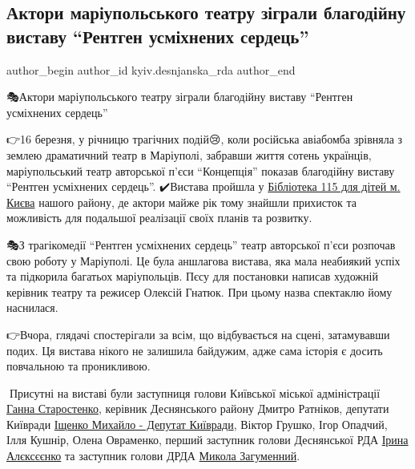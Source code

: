  
 
 
 
 

\subsection{Актори маріупольського театру зіграли благодійну виставу \enquote{Рентген усміхнених сердець}}
\label{sec:17_03_2023.fb.kyiv.desnjanska_rda.1.mariupol_teatr_rentgen_serdec}

\ifcmt
 author_begin
   author_id kyiv.desnjanska_rda
 author_end
\fi

🎭Актори маріупольського театру зіграли благодійну виставу \enquote{Рентген усміхнених
сердець}

👉16 березня, у річницю трагічних подій😢, коли російська авіабомба зрівняла з
землею драматичний театр в Маріуполі, забравши життя сотень українців,
маріупольський театр авторської п'єси \enquote{Концепція} показав благодійну виставу
\enquote{Рентген усміхнених сердець}. ✔️Вистава пройшла у \href{https://www.facebook.com/lybra115}{Бібліотека 115 для дітей м.
Києва} нашого району, де актори майже рік тому знайшли прихисток та можливість
для подальшої реалізації своїх планів та розвитку. 

🎭З трагікомедії \enquote{Рентген усміхнених сердець} театр авторської п'єси розпочав
свою роботу у Маріуполі. Це була аншлагова вистава, яка мала неабиякий успіх та
підкорила багатьох маріупольців. Пєсу для постановки написав художній керівник
театру та режисер Олексій Гнатюк. При цьому назва спектаклю йому наснилася.

👉Вчора, глядачі спостерігали за всім, що відбувається на сцені, затамувавши
подих. Ця вистава нікого не залишила байдужим, адже сама історія є досить
повчальною та проникливою. 

🤝Присутні на виставі були заступниця голови Київської міської адміністрації
\href{https://www.facebook.com/starostenkodesnanka}{Ганна Старостенко},
керівник Деснянського району Дмитро Ратніков, депутати Київради
\href{https://www.facebook.com/ISHCHENKO.org.ua}{Іщенко Михайло - Депутат
Київради}, Віктор Грушко, Ігор Опадчий, Ілля Кушнір, Олена Овраменко, перший
заступник голови Деснянської РДА \href{https://www.facebook.com/profile.php?id=100003219216765}{Ірина Алєксєєнко} та заступник голови ДРДА
\href{https://www.facebook.com/profile.php?id=100050622292319}{Микола Загуменний}.

